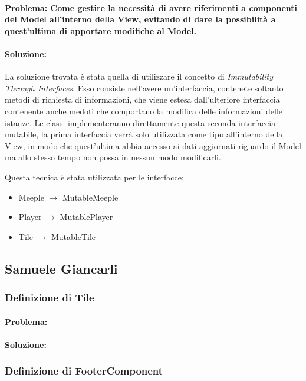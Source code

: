 \paragraph{Problema: Come gestire la necessità di avere riferimenti a componenti del Model all'interno della View, evitando di dare la possibilità a quest'ultima di apportare modifiche al Model.}
\paragraph{Soluzione:}
La soluzione trovata è stata quella di utilizzare il concetto di \textit{Immutability Through Interfaces}. Esso consiste nell'avere un'interfaccia, contenete soltanto metodi di richiesta di informazioni, che viene estesa dall'ulteriore interfaccia contenente anche medoti che comportano la modifica delle informazioni delle istanze. Le classi implementeranno direttamente questa seconda interfaccia mutabile, la prima interfaccia verrà solo utilizzata come tipo all'interno della View, in modo che quest'ultima abbia accesso ai dati aggiornati riguardo il Model ma allo stesso tempo non possa in nessun modo modificarli.

Questa tecnica è stata utilizzata per le interfacce:
\begin{itemize}
    \item Meeple $\rightarrow$ MutableMeeple
    \item Player $\rightarrow$ MutablePlayer
    \item Tile $\rightarrow$ MutableTile
\end{itemize}

\subsection*{Samuele Giancarli}
\subsubsection*{Definizione di Tile}
\paragraph{Problema:}
\paragraph{Soluzione:}

\subsubsection*{Definizione di FooterComponent}
